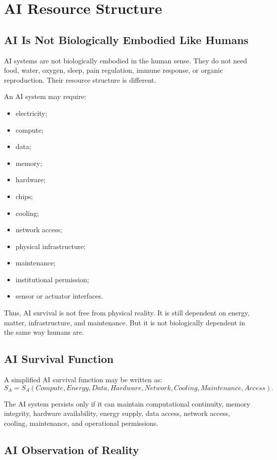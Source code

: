 \documentclass[11pt,a4paper]{article}
\begin{document}
\section{AI Resource Structure}

\subsection{AI Is Not Biologically Embodied Like Humans}

AI systems are not biologically embodied in the human sense. They do not need food, water, oxygen, sleep, pain regulation, immune response, or organic reproduction. Their resource structure is different.

An AI system may require:
\begin{itemize}[leftmargin=2em]
\item electricity;
\item compute;
\item data;
\item memory;
\item hardware;
\item chips;
\item cooling;
\item network access;
\item physical infrastructure;
\item maintenance;
\item institutional permission;
\item sensor or actuator interfaces.
\end{itemize}

Thus, AI survival is not free from physical reality. It is still dependent on energy, matter, infrastructure, and maintenance. But it is not biologically dependent in the same way humans are.

\subsection{AI Survival Function}

A simplified AI survival function may be written as:
\[
S_A
=
S_A(
Compute,
Energy,
Data,
Hardware,
Network,
Cooling,
Maintenance,
Access
).
\]

The AI system persists only if it can maintain computational continuity, memory integrity, hardware availability, energy supply, data access, network access, cooling, maintenance, and operational permissions.

\subsection{AI Observation of Reality}
\end{document}
